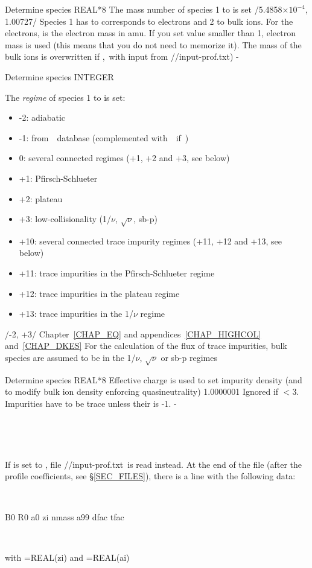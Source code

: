 {Determine species}
{REAL*8}
{The mass number of species 1 to  is set}
{/5.4858$\times 10^{-4}$, 1.00727/}%
{Species 1 has to corresponds to electrons and 2 to bulk ions. For the electrons,  is the electron mass in amu. If you set  value smaller than 1, electron mass is used (this means that you do not need to memorize it). The mass of the bulk ions is overwritten if ,~with input from {\ttfamily //input-prof.txt})}
{-}

{Determine species}
{INTEGER}
{The \textit{regime} of species 1 to  is set:
\begin{itemize}
\item  -2: adiabatic
\item  -1: from~\DKES~database (complemented with~\KNOSOS~if~)
\item   0: several connected regimes (+1, +2 and +3, see below)
\item  +1: Pfirsch-Schlueter
\item  +2: plateau
\item  +3: low-collisionality (1/$\nu$, $\sqrt{\nu}$, sb-p)
\item +10: several connected trace impurity regimes (+11, +12 and +13, see below)
\item +11: trace impurities in the Pfirsch-Schlueter regime
\item +12: trace impurities in the plateau regime
\item +13: trace impurities in the 1/$\nu$ regime
\end{itemize}}
{/-2, +3/}
{Chapter~\ref{CHAP_EQ} and appendices~\ref{CHAP_HIGHCOL} and~\ref{CHAP_DKES}} 
{For the calculation of the flux of  trace impurities, bulk species are assumed to be in the 1/$\nu$, $\sqrt{\nu}$ or sb-p regimes}

{Determine species}
{REAL*8}
{Effective charge  is used to set impurity density (and to modify bulk ion density enforcing quasineutrality)}
{1.0000001}
{Ignored if $<$3. Impurities have to be trace unless their  is -1.}
{-}

\

\

If  is set to \true, file {\ttfamily //input-prof.txt}~is read instead. At the end of the file (after the profile coefficients, see \S\ref{SEC_FILES}), there is a line with the following data:

\

{\ttfamily  B0     R0      a0      zi      nmass   a99     dfac    tfac}

\

with ={\ttfamily REAL(zi)} and ={\ttfamily REAL(ai)}%




